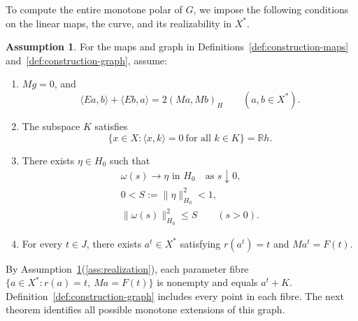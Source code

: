 \documentclass[11pt]{article}
\newcommand{\R}{\mathbb R}
\newcommand{\pair}[2]{\langle #1,#2\rangle}
\theoremstyle{definition}
\newtheorem{assumption}{Assumption}
\theoremstyle{remark}
\begin{document}
To compute the entire monotone polar of $G$, we impose the following
conditions on the linear maps, the curve, and its realizability in $X^*$.
\begin{assumption}\label{ass:construction}
For the maps and graph in Definitions~\ref{def:construction-maps}
and~\ref{def:construction-graph}, assume:
\begin{enumerate}
\renewcommand{\theenumi}{H\arabic{enumi}}
\renewcommand{\labelenumi}{(\theenumi)}
\item\label{ass:bilinear} $Mg=0$, and
\begin{equation}
\pair{Ea}{b}+\pair{Eb}{a}=2(Ma,Mb)_H
\qquad(a,b\in X^*).
\label{eq:abs-bilinear}
\end{equation}

\item\label{ass:annihilator} The subspace $K$ satisfies
\begin{equation}
\{x\in X:\pair{x}{k}=0\ \text{for all }k\in K\}=\R h.
\label{eq:abs-annihilator}
\end{equation}

\item\label{ass:curve-limit} There exists $\eta\in H_0$ such that
\begin{equation}
\begin{gathered}
\omega(s)\longrightarrow\eta\text{ in }H_0
\quad\text{as }s\downarrow0,\\
0<S:=\|\eta\|_{H_0}^2<1,\\
\|\omega(s)\|_{H_0}^2\le S\qquad(s>0).
\end{gathered}
\label{eq:abs-tail}
\end{equation}

\item\label{ass:realization} For every $t\in J$, there exists $a^t\in X^*$
satisfying $r(a^t)=t$ and $Ma^t=F(t)$.
\end{enumerate}
\end{assumption}
By Assumption~\ref{ass:construction}\textup{(\ref{ass:realization})}, each parameter fibre
$\{a\in X^*:r(a)=t,\ Ma=F(t)\}$ is nonempty and equals $a^t+K$.
Definition~\ref{def:construction-graph} includes every point in each fibre.
The next theorem identifies all possible monotone extensions of this graph. 
\end{document}
